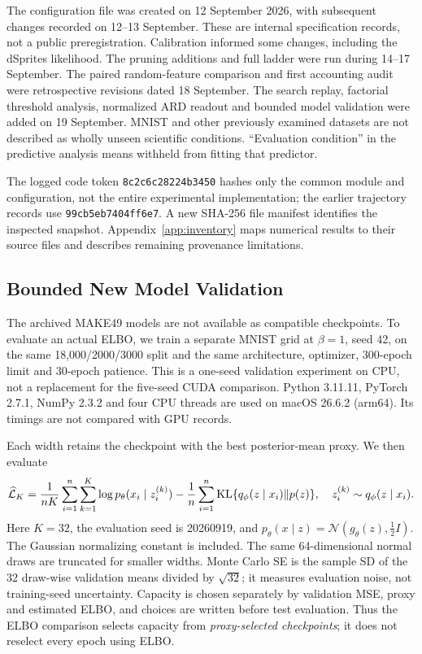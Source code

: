 \documentclass[make,article,submit,pdftex,moreauthors]{Definitions/mdpi}
\begin{document}
The configuration file was created on 12 September 2026, with subsequent
changes recorded on 12--13 September. These are internal specification
records, not a public preregistration. Calibration informed some changes,
including the dSprites likelihood. The pruning additions and full ladder
were run during 14--17 September. The paired random-feature comparison
and first accounting audit were retrospective revisions dated 18 September.
The search replay, factorial threshold analysis, normalized ARD readout
and bounded model validation were added on 19 September.
MNIST and other previously examined datasets are not described as wholly
unseen scientific conditions. ``Evaluation condition'' in the predictive
analysis means withheld from fitting that predictor.

The logged code token \texttt{8c2c6c28224b3450} hashes only the common
module and configuration, not the entire experimental implementation;
the earlier trajectory records use \texttt{99cb5eb7404ff6e7}.
A new SHA-256 file manifest identifies the inspected snapshot.
Appendix~\ref{app:inventory} maps numerical results to their source files
and describes remaining provenance limitations.

\subsection{Bounded New Model Validation}\label{sec:newvalidation}
The archived MAKE49 models are not available as compatible checkpoints.
To evaluate an actual ELBO, we train a separate MNIST grid at $\beta=1$,
seed 42, on the same 18,000/2000/3000 split and the same architecture,
optimizer, 300-epoch limit and 30-epoch patience. This is a one-seed
validation experiment on CPU, not a replacement for the five-seed CUDA
comparison. Python 3.11.11, PyTorch 2.7.1, NumPy 2.3.2 and four CPU threads
are used on macOS 26.6.2 (arm64). Its timings are not compared with GPU
records.

Each width retains the checkpoint with the best posterior-mean proxy.
We then evaluate
\begin{equation}
 \widehat{\mathcal L}_K
 =\frac{1}{nK}\sum_{i=1}^n\sum_{k=1}^K
 \log p_\theta(x_i\mid z_i^{(k)})
 -\frac1n\sum_{i=1}^n
 {\rm KL}\{q_\phi(z\mid x_i)\Vert p(z)\},\quad
 z_i^{(k)}\sim q_\phi(z\mid x_i).
 \label{eq:mc}
\end{equation}
Here $K=32$, the evaluation seed is 20260919, and
$p_\theta(x\mid z)=\mathcal N(g_\theta(z),\tfrac12 I)$.
The Gaussian normalizing constant is included. The same 64-dimensional
normal draws are truncated for smaller widths. Monte Carlo SE is the
sample SD of the 32 draw-wise validation means divided by $\sqrt{32}$;
it measures evaluation noise, not training-seed uncertainty.
Capacity is chosen separately by validation MSE, proxy and estimated
ELBO, and choices are written before test evaluation. Thus the ELBO
comparison selects capacity from \emph{proxy-selected checkpoints};
it does not reselect every epoch using ELBO.
\end{document}
